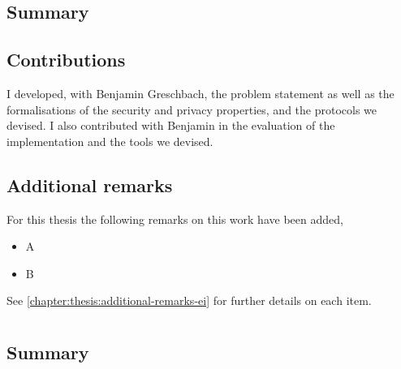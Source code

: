 \subsection{Summary}
    \label{subsection:summary-ei}


\subsection{Contributions}
    \label{subsection:contributions-ei}
I developed, with Benjamin Greschbach, the problem statement as well as the formalisations 
of the security and privacy properties, and the protocols we devised. I also contributed 
with Benjamin in the evaluation of the implementation and the tools we devised.

\subsection{Additional remarks}
    \label{subsection:additional-remarks-ei}
For this thesis the following remarks on this work have been added,
\begin{itemize}
    \item A
    \item B
\end{itemize}
See \cref{chapter:thesis:additional-remarks-ei} for further details on each item.

\section{}
\begingroup\centering
\begin{ppBox}
\end{ppBox}
\endgroup

\subsection{Summary}
    \label{subsection:summary-dss}



